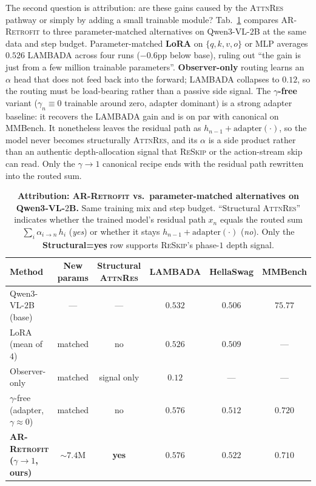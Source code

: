 \documentclass{article}
\newcommand{\attnres}{\textsc{AttnRes}}
\newcommand{\reskip}{\textsc{ReSkip}}
\newcommand{\retrofit}{\textsc{AR-Retrofit}}
\begin{document}
The second question is attribution: are these gains caused by the \attnres{} pathway or simply by adding a small trainable module? Tab.~\ref{tab:attribution} compares \retrofit{} to three parameter-matched alternatives on Qwen3-VL-$2$B at the same data and step budget. Parameter-matched \textbf{LoRA} on $\{q,k,v,o\}$ or MLP averages $0.526$ LAMBADA across four runs ($-0.6$pp below base), ruling out ``the gain is just from a few million trainable parameters''. \textbf{Observer-only} routing learns an $\alpha$ head that does not feed back into the forward; LAMBADA collapses to $0.12$, so the routing must be load-bearing rather than a passive side signal. The \textbf{$\gamma$-free} variant ($\gamma_n{\equiv}0$ trainable around zero, adapter dominant) is a strong adapter baseline: it recovers the LAMBADA gain and is on par with canonical on MMBench. It nonetheless leaves the residual path as $h_{n-1} + \mathrm{adapter}(\cdot)$, so the model never becomes structurally \attnres{}, and its $\alpha$ is a side product rather than an authentic depth-allocation signal that \reskip{} or the action-stream skip can read. Only the $\gamma{\to}1$ canonical recipe ends with the residual path rewritten into the routed sum.

\begin{table}[t]
\caption{\textbf{Attribution: \retrofit{} vs.\ parameter-matched alternatives on Qwen3-VL-$2$B.} Same training mix and step budget. ``Structural \attnres{}'' indicates whether the trained model's residual path $x_n$ equals the routed sum $\sum_i \alpha_{i\to n}\,h_i$ (\emph{yes}) or whether it stays $h_{n-1}+\mathrm{adapter}(\cdot)$ (\emph{no}). Only the \textbf{Structural=yes} row supports \reskip{}'s phase-$1$ depth signal.}
\label{tab:attribution}
\centering\small
\begin{tabular}{lccccc}
\toprule
Method & New params & Structural \attnres{} & LAMBADA & HellaSwag & MMBench \\
\midrule
Qwen3-VL-$2$B (base)                       & ---         & ---     & $0.532$ & $0.506$ & $75.77$ \\
LoRA (mean of $4$)                         & matched & no      & $0.526$ & $0.509$ & --- \\
Observer-only                              & matched & signal only & $0.12$  & ---     & --- \\
$\gamma$-free (adapter, $\gamma{\approx}0$)& matched & no      & $0.576$ & $0.512$ & $0.720$ \\
\textbf{\retrofit{} ($\gamma{\to}1$, ours)}& $\sim$$7.4$M & \textbf{yes} & $\mathbf{0.576}$ & $\mathbf{0.522}$ & $\mathbf{0.710}$ \\
\bottomrule
\end{tabular}
\end{table}
\end{document}
